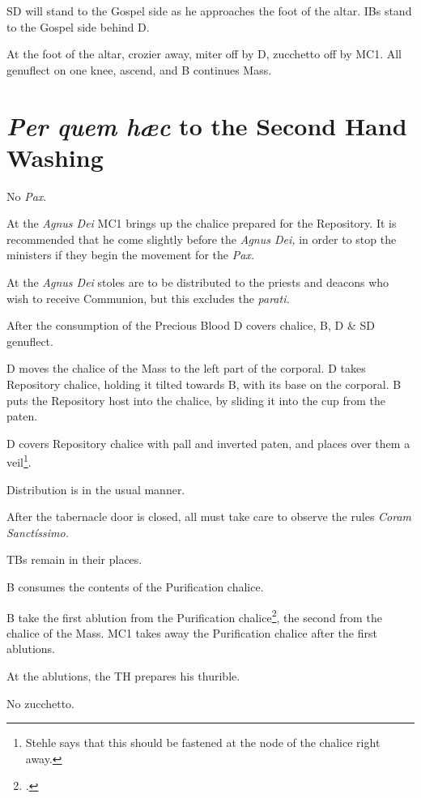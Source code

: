 {\rubric SD will stand to the Gospel side as he approaches the foot of the
altar. IBs stand to the Gospel side behind D.

\rubric At the foot of the altar, crozier away, miter off by D, zucchetto off
by MC1. All genuflect on one knee, ascend, and B continues Mass.

\section{\textit{Per quem hæc} to the Second Hand Washing}

\rubric No \textit{Pax}.

\rubric At the \textit{Agnus Dei} MC1 brings up the chalice prepared for the
Repository. It is recommended that he come slightly before the \textit{Agnus
Dei,} in order to stop the ministers if they begin the movement for the
\textit{Pax.}

\rubric At the \textit{Agnus Dei} stoles are to be distributed to the priests
and deacons who wish to receive Communion, but this excludes the
\textit{parati.}

\rubric After the consumption of the Precious Blood D covers chalice, B, D \&
SD genuflect. 

\rubric D moves the chalice of the Mass to the left part of the corporal. D
takes Repository chalice, holding it tilted towards B, with its base on the
corporal. B puts the Repository host into the chalice, by sliding it into the
cup from the paten.

\rubric D covers Repository chalice with pall and inverted paten, and places
over them a veil\footnote{Stehle says that this should be fastened at the node
of the chalice right away.}.

\rubric Distribution is in the usual manner.

\rubric After the tabernacle door is closed, all must take care to observe the
rules \textit{Coram Sanctíssimo.}

\rubric TBs remain in their places.

\rubric B consumes the contents of the Purification chalice.

\rubric B take the first ablution from the Purification
chalice\footcite[186]{stehle}, the second from the chalice of the Mass. MC1
takes away the Purification chalice after the first ablutions.

\rubric At the ablutions, the TH prepares his thurible.

\rubric No zucchetto.

}
